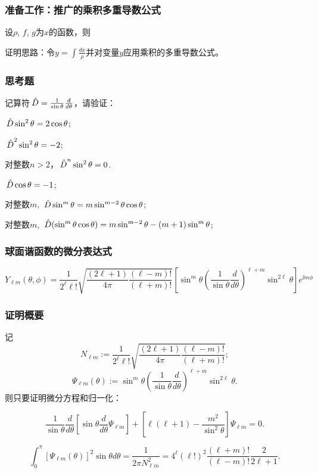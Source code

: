 \documentclass[CJK]{beamer}
\begin{document}
\begin{frame}
  \frametitle{准备工作：推广的乘积多重导数公式}
  
  设$\rho$, $f$, $g$为$x$的函数，则

  \skipline
  
  {\small \darkgreen 证明思路：令$y = \int \frac{dx}{\rho}$并对变量$y$应用乘积的多重导数公式。}
  
  
\end{frame}


\begin{frame}
\frametitle{思考题}

记算符${\,\hat{D}} = \frac{1}{\sin\theta}\frac{d}{d\theta}$，请验证：
\bitem
\item{${\,\hat{D}}\sin^2\theta = 2\cos\theta$;}
\item{${\,\hat{D}}^2\sin^2\theta = -2$;}
\item{对整数$n>2$，${\,\hat{D}}^n \sin^2\theta = 0$.}  
\item{${\,\hat{D}}\cos\theta = -1$;}
\item{对整数$m$, ${\,\hat{D}} \sin^m\theta = m \sin^{m-2}\theta \cos\theta$;}
\item{对整数$m$, ${\,\hat{D}} (\sin^m\theta\cos\theta) =m\sin^{m-2}\theta - (m+1)\sin^m\theta$;}  
\eitem
  

\end{frame}




\begin{frame}
  \frametitle{球面谐函数的微分表达式}
  

  {\small \blue
    $$ Y_{\ell m}(\theta,\phi) =\frac{1}{2^\ell \ell !}\sqrt{\frac{(2\ell+1)}{4\pi} \frac{(\ell-m)!}{(\ell+m)!}}\left[\sin^m\theta \left(\frac{1}{\sin\theta}\frac{d}{d\theta}\right)^{\ell+m}\sin^{2\ell}\theta \right] e^{\ii m\phi}$$}

  
\end{frame}


\begin{frame}
  \frametitle{证明概要}
  
  记
  $$N_{\ell m}  := \frac{1}{2^\ell \ell !}\sqrt{\frac{(2\ell+1)}{4\pi} \frac{(\ell-m)!}{(\ell+m)!}};$$
  $$\Psi_{\ell m}(\theta)  := \sin^m\theta \left(\frac{1}{\sin\theta}\frac{d}{d\theta}\right)^{\ell+m}\sin^{2\ell}\theta. $$
  则只要证明微分方程和归一化：
  \bitem
\item{$$ \frac{1}{\sin \theta}\frac{d}{d\theta} \left[\sin\theta \frac{d}{d\theta}\Psi_{\ell m}\right] + \left[\ell(\ell+1)-\frac{m^2}{\sin^2\theta}\right]\Psi_{\ell m} = 0.$$}
\item{$$ \int_0^\pi \left[\Psi_{\ell m}(\theta)\right]^2 \sin\theta d\theta =  \frac{1}{2\pi N_{\ell m}^2} = 4^\ell (\ell!)^2\frac{(\ell+m)!}{(\ell-m)!} \frac{2}{2\ell+1}.  $$
}
  \eitem
  
\end{frame}
\end{document}
